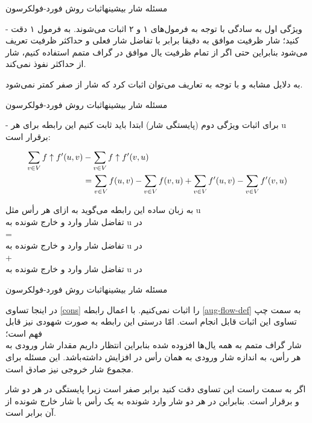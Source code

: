 \begin{itemframe}{مسئله شار بیشینه}{اثبات روش فورد-فولکرسون}
\item[-]
ویژگی اول به سادگی با توجه به فرمول‌های ۱ و ۲ اثبات می‌شوند. به فرمول ۱ دقت کنید‍؛ شار ظرفیت موافق به دقیقا برابر با تفاضل شار فعلی و حداکثر ظرفیت تعریف می‌شود بنابراین حتی اگر از تمام ظرفیت یال موافق در گراف متمم استفاده کنیم، شار
از حداکثر نفوذ نمی‌کند.
\item
به دلایل مشابه و با توجه به تعاریف می‌توان اثبات کرد که شار
از صفر کمتر نمی‌شود.
\end{itemframe}
\begin{itemframe}{مسئله شار بیشینه}{اثبات روش فورد-فولکرسون}
\item[-]
برای اثبات ویژگی دوم (پایستگی شار) ابتدا باید ثابت کنیم این رابطه برای هر u برقرار است:

\begin{align}
\sum_{v\in V} f \uparrow f'(u, v)  & - \sum_{v\in V} f \uparrow f'(v, u) \notag \\
&=
 \sum_{v\in V} f(u, v) - \sum_{v\in V} f (v, u)
+
\sum_{v\in V} f'(u, v) - \sum_{v\in V} f'(v, u)
\label{cons}
\end{align}
\item

به زبان ساده این رابطه می‌گوید به ازای هر رأس مثل u\\
تفاضل شار وارد و خارج شونده به u در
 \\
=\\
تفاضل شار وارد و خارج شونده به u در
 \\
+\\
تفاضل شار وارد و خارج شونده به u در
\\


\end{itemframe}
\begin{itemframe}{مسئله شار بیشینه}{اثبات روش فورد-فولکرسون}
\item
در اینجا تساوی \ref{cons} را اثبات نمی‌کنیم. با اعمال رابطه \ref{aug-flow-def} به سمت چپ تساوی این اثبات قابل انجام است. امّا درستی این رابطه به صورت شهودی نیز قابل فهم است؛
\\
شار گراف متمم به همه یال‌ها افزوده شده بنابراین انتظار داریم مقدار شار ورودی به هر رأس، به اندازه شار ورودی به همان رأس در
افزایش داشته‌باشد. این مسئله برای مجموع شار خروجی نیز صادق است.
\item
اگر به سمت راست این تساوی دقت کنید برابر صفر است زیرا پایستگی در هر دو شار
و
برقرار است. بنابراین در هر دو شار وارد شونده به یک رأس با شار خارج شونده از آن برابر است.
\end{itemframe}
